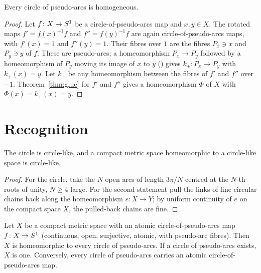 \begin{theorem}\label{thm:homog}
Every circle of pseudo-arcs is homogeneous.
\end{theorem}

\begin{proof}
Let $f\colon X\to S^1$ be a circle-of-pseudo-arcs map and $x,y\in X$. The rotated maps $f'=f(x)^{-1}f$ and $f''=f(y)^{-1}f$ are again circle-of-pseudo-arcs maps, with $f'(x)=1$
and $f''(y)=1$. Their fibres over $1$ are the fibres $P_x\ni x$ and $P_y\ni y$ of $f$. These are pseudo-arcs; a homeomorphism $P_x\to P_y$ followed by a homeomorphism of $P_y$
moving its image of $x$ to $y$ () gives $k_+\colon P_x\to P_y$ with $k_+(x)=y$. Let $k_-$ be any homeomorphism between the fibres of $f'$ and $f''$
over $-1$. Theorem~\ref{thm:glue} for $f'$ and $f''$ gives a homeomorphism $\Phi$ of $X$ with $\Phi(x)=k_+(x)=y$.
\end{proof}


\section{Recognition}

\begin{lemma}\label{lem:circlelike-homeo}
The circle is circle-like, and a compact metric space homeomorphic to a circle-like space is circle-like.
\end{lemma}

\begin{proof}
For the circle, take the $N$ open arcs of length $3\pi/N$ centred at the $N$-th roots of unity, $N\ge4$ large. For the second statement pull the links of fine circular chains back
along the homeomorphism $e\colon X\to Y$; by uniform continuity of $e$ on the compact space $X$, the pulled-back chains are fine.
\end{proof}


\begin{theorem}\label{thm:dp61}
Let $X$ be a compact metric space with an atomic circle-of-pseudo-arcs map $f\colon X\to S^1$ (continuous, open, surjective, atomic, with pseudo-arc fibres). Then $X$ is
homeomorphic to every circle of pseudo-arcs. If a circle of pseudo-arcs exists, $X$ is one. Conversely, every circle of pseudo-arcs carries an atomic circle-of-pseudo-arcs
map.
\end{theorem}

